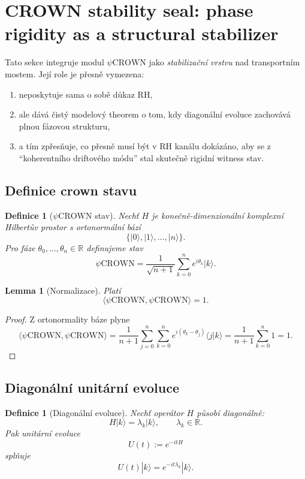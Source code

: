 \documentclass[11pt,a4paper]{article}
\newtheorem{lemma}[theorem]{Lemma}
\newtheorem{definition}[theorem]{Definice}
\begin{document}
\section{CROWN stability seal: phase rigidity as a structural stabilizer}

Tato sekce integruje modul \(\psi\mathrm{CROWN}\) jako \emph{stabilizační vrstvu} nad
transportním mostem. Její role je přesně vymezena:
\begin{enumerate}
    \item neposkytuje sama o sobě důkaz RH,
    \item ale dává čistý modelový theorem o tom, kdy diagonální evoluce zachovává
    plnou fázovou strukturu,
    \item a tím zpřesňuje, co přesně musí být v RH kanálu dokázáno, aby se z
    ``koherentního driftového módu'' stal skutečně rigidní witness stav.
\end{enumerate}

\subsection*{Definice crown stavu}

\begin{definition}[\(\psi\mathrm{CROWN}\) stav]
Nechť \(H\) je konečně-dimenzionální komplexní Hilbertův prostor s ortonormální bází
\[
\{|0\rangle,|1\rangle,\dots,|n\rangle\}.
\]
Pro fáze \(\theta_0,\dots,\theta_n\in\mathbb{R}\) definujeme stav
\[
\psi\mathrm{CROWN}
=
\frac{1}{\sqrt{n+1}}
\sum_{k=0}^{n} e^{i\theta_k}|k\rangle.
\]
\end{definition}

\begin{lemma}[Normalizace]
Platí
\[
\langle \psi\mathrm{CROWN},\psi\mathrm{CROWN}\rangle=1.
\]
\end{lemma}

\begin{proof}
Z ortonormality báze plyne
\[
\langle \psi\mathrm{CROWN},\psi\mathrm{CROWN}\rangle
=
\frac{1}{n+1}\sum_{j=0}^{n}\sum_{k=0}^{n}
e^{i(\theta_k-\theta_j)}\langle j|k\rangle
=
\frac{1}{n+1}\sum_{k=0}^{n}1=1.
\]
\end{proof}

\subsection*{Diagonální unitární evoluce}

\begin{definition}[Diagonální evoluce]
Nechť operátor \(H\) působí diagonálně:
\[
H|k\rangle=\lambda_k|k\rangle,
\qquad \lambda_k\in\mathbb{R}.
\]
Pak unitární evoluce
\[
U(t):=e^{-itH}
\]
splňuje
\[
U(t)|k\rangle=e^{-it\lambda_k}|k\rangle.
\]
\end{definition}
\end{document}
